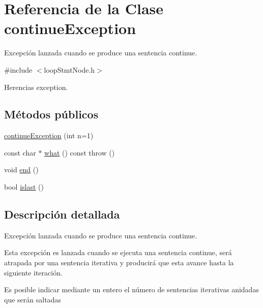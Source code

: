\hypertarget{classcontinueException}{\section{Referencia de la Clase continue\-Exception}
\label{classcontinueException}
}


Excepción lanzada cuando se produce una sentencia continue.  




{\ttfamily \#include $<$loop\-Stmt\-Node.\-h$>$}



Herencias exception.

\subsection*{Métodos públicos}
\begin{DoxyCompactItemize}
\item 
\hyperlink{classcontinueException_a025267d9810bc2d480353adb6ee43d86}{continue\-Exception} (int n=1)
\item 
const char $\ast$ \hyperlink{classcontinueException_acf175be01b6e026c7e1354e587459f75}{what} () const   throw ()
\item 
void \hyperlink{classcontinueException_aa379e96a9c81362522a9d8535ce7ad05}{end} ()
\item 
bool \hyperlink{classcontinueException_a3ba0b14f7e927fe2dced4624bbfe90fc}{islast} ()
\end{DoxyCompactItemize}


\subsection{Descripción detallada}
Excepción lanzada cuando se produce una sentencia continue. 

Esta excepción es lanzada cuando se ejecuta una sentencia continue, será atrapada por una sentencia iterativa y producirá que esta avance hasta la siguiente iteración.

Es posible indicar mediante un entero el número de sentencias iterativas anidadas que serán saltadas 

